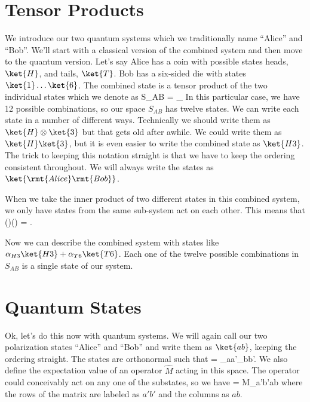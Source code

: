 \section{Tensor Products}
We introduce our two quantum systems which we traditionally name ``Alice'' and ``Bob''. We'll start with a classical version of the combined system and then move to the quantum version. Let's say Alice has a coin with possible states heads, $\ket{H}$, and tails, $\ket{T}$. Bob has a six-sided die with states $\ket{1}\ldots\ket{6}$. The combined state is a tensor product of the two individual states which we denote as
\beq
S_{AB} = _{}
\eeq
In this particular case, we have 12 possible combinations, so our space $S_{AB}$ has twelve states. We can write each state in a number of different ways. Technically we should write them as $\ket{H}\otimes\ket{3}$ but that gets old after awhile. We could write them as $\ket{H}\ket{3}$, but it is even easier to write the combined state as $\ket{H3}$. The trick to keeping this notation straight is that we have to keep the ordering consistent throughout. We will always write the states as $\ket{\rmt{Alice }\rmt{Bob}}$.

When we take the inner product of two different states in this combined system, we only have states from the same sub-system act on each other. This means that
\beq
\left(\otimes{}\right)\left(\otimes{}\right) = \otimes{}.
\eeq

Now we can describe the combined system with states like $\alpha_{H3}\ket{H3} + \alpha_{T6}\ket{T6}$. Each one of the twelve possible combinations in $S_{AB}$ is a single state of our system.

\section{Quantum States}
Ok, let's do this now with quantum systems. We will again call our two polarization states ``Alice'' and ``Bob'' and write them as $\ket{ab}$, keeping the ordering straight. The states are orthonormal such that
\beq
{} = \delta_{aa'}\delta_{bb'}.
\eeq
We also define the expectation value of an operator $\hat{M}$ acting in this space. The operator could conceivably act on any one of the substates, so we have 
\beq
{} = M_{a'b'ab}
\eeq
where the rows of the matrix are labeled as $a'b'$ and the columns as $ab$.

